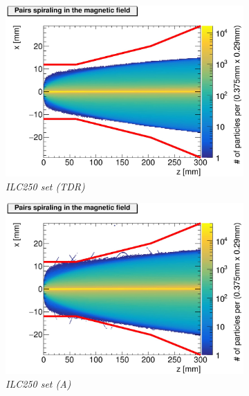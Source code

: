 \begin{figure}[h]
\centering
\begin{subfigure}[t]{0.49\textwidth}
\centering
\includegraphics[width=\textwidth]{figures/Helix_tracks_xz_100bunches_250GeV_5T_DanielJeans-1.jpg}
\caption{\textit{ILC250 set (TDR)}}
\end{subfigure}
\hspace*{0.08cm}
\begin{subfigure}[t]{0.49\textwidth}
\centering
\includegraphics[width=\textwidth]{figures/Helix_tracks_xz_80bunches_250GeV_5T_Reduced_Emittance_x-1.jpg}
\caption{\textit{ILC250 set (A)}}
\end{subfigure}
\\
\begin{subfigure}[t]{0.49\textwidth}
\centering

\end{subfigure}
\end{figure}

